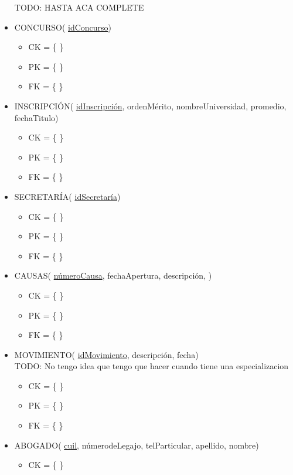 \begin{itemize}
	
	\begin{center}
TODO: HASTA ACA COMPLETE 
\end{center}
	
\item CONCURSO( \underline{idConcurso})
	\begin{itemize}
		\item CK = \{ \}
		\item PK = \{ \}
		\item FK = \{ \}
	\end{itemize}
	
\item INSCRIPCIÓN( \underline{idInscripción}, ordenMérito, nombreUniversidad, promedio, fechaTitulo)
	\begin{itemize}
		\item CK = \{ \}
		\item PK = \{ \}
		\item FK = \{ \}
	\end{itemize}
\item SECRETARÍA( \underline{idSecretaría})
	\begin{itemize}
		\item CK = \{ \}
		\item PK = \{ \}
		\item FK = \{ \}
	\end{itemize}
\item CAUSAS( \underline{númeroCausa}, fechaApertura, descripción, ) \\
	\begin{itemize}
		\item CK = \{ \}
		\item PK = \{ \}
		\item FK = \{ \}
	\end{itemize}
\item MOVIMIENTO( \underline{idMovimiento}, descripción, fecha) \\
TODO: No tengo idea que tengo que hacer cuando tiene una especializacion 
	\begin{itemize}
		\item CK = \{ \}
		\item PK = \{ \}
		\item FK = \{ \}
	\end{itemize}
\item ABOGADO( \underline{cuil}, númerodeLegajo, telParticular, apellido, nombre)
	\begin{itemize}
		\item CK = \{ \}

\end{itemize}
\end{itemize}
